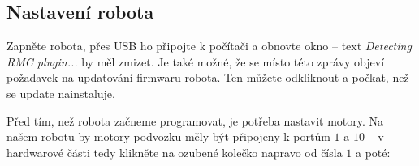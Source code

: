 \documentclass[../main.tex]{subfiles}
\begin{document}
	\begin{figure}[h!]
		\centering
	\end{figure}

	\subsection{Nastavení robota}
	Zapněte robota, přes USB ho připojte k počítači a obnovte okno -- text \textit{Detecting RMC plugin...} by měl zmizet. Je také možné, že se místo této zprávy objeví požadavek na updatování firmwaru robota. Ten můžete odkliknout a počkat, než se update nainstaluje.

	Před tím, než robota začneme programovat, je potřeba nastavit motory. Na našem robotu by motory podvozku měly být připojeny k portům $1$ a $10$ -- v hardwarové části tedy klikněte na ozubené kolečko napravo od čísla $1$ a poté:
\end{document}
